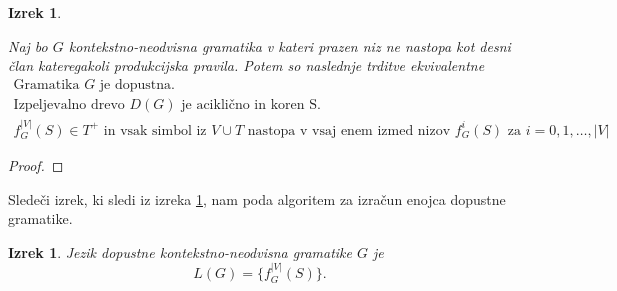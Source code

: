 \documentclass{amsart}
\theoremstyle{definition}
\theoremstyle{plain} %
\newtheorem{izrek}[definicija]{Izrek}
\begin{document}
\begin{izrek}\label{ekvivalence}

    Naj bo $G$ kontekstno-neodvisna gramatika v kateri prazen niz ne nastopa kot desni član kateregakoli
    produkcijska pravila. Potem so naslednje trditve ekvivalentne
    \begin{gather}
        \text{Gramatika } G \text{ je dopustna}. \\
        \text{Izpeljevalno drevo } D(G) \text{ je aciklično in koren S}. \\
        f_G^{|V|}(S) \in T^+ \text{ in vsak simbol iz } V \cup T \text{ nastopa v vsaj enem izmed nizov }
        f_G^i(S) \text{ za } i = 0, 1, \ldots, |V|
    \end{gather}

\end{izrek}

\begin{proof}
    
\end{proof}

Sledeči izrek, ki sledi iz izreka \ref{ekvivalence}, nam poda algoritem za izračun enojca dopustne gramatike.

\begin{izrek}

    Jezik dopustne kontekstno-neodvisna gramatike $G$ je
    \[
        L(G) = \{f_G^{|V|}(S) \}.
    \]

\end{izrek}
\end{document}

